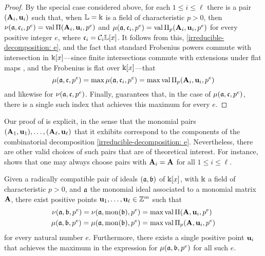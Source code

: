 \documentclass{amsart}
\begin{document}
\begin{proof}
By the special case considered above, for each $1\le i \le \ell$ there is a pair $(\mathbf{A}_i, \mathbf{u}_i)$ such that, when $\mathbb{L}=\Bbbk$ is a field of characteristic $p>0$, then $\nu(\mathfrak{a}, \mathfrak{c}_i, p^e) = \operatorname{val} \Pi(\mathbf{A}_i, \mathbf{u}_i, p^e)$ and $\mu(\mathfrak{a}, \mathfrak{c}_i, p^e) = \operatorname{val} \Pi_p(\mathbf{A}_i, \mathbf{u}_i, p^e)$ for every positive integer $e$, where $\mathfrak{c}_i = \mathcal{C}_i \mathbb{L}[x]$.    It follows from this, \eqref{irreducible-decomposition: e}, and the fact that standard Frobenius powers commute with intersection in $\Bbbk[x]$---since finite intersections commute with extensions under flat maps \cite[Theorem~7.4(ii)]{matsumura}, and the Frobenius is flat over $\Bbbk[x]$---that
%
\[ \mu(\mathfrak{a}, \mathfrak{c}, p^e) = \max  \mu(\mathfrak{a}, \mathfrak{c}_i, p^e)  = \max \operatorname{val} \Pi_p(\mathbf{A}_i, \mathbf{u}_i, p^e) \] and likewise for $\nu(\mathfrak{a}, \mathfrak{c}, p^e)$.  Finally,   guarantees that, in the case of $\mu(\mathfrak{a}, \mathfrak{c}, p^e)$, there is a single such index that achieves this maximum for every $e$.
\end{proof}

\begin{remark}
\label{lifting pairs: R}
{Our proof of}  is explicit, in the sense that the monomial pairs $(\mathbf{A}_1, \mathbf{u}_1), \ldots, (\mathbf{A}_{\ell}, \mathbf{u}_{\ell})$ that it exhibits correspond to the components of the combinatorial decomposition \eqref{irreducible-decomposition: e}.  Nevertheless, there are other valid choices of such pairs that are of theoretical interest.
For instance,   shows that one may always choose pairs with $\mathbf{A}_i=\mathbf{A}$ for all $1 \leq i \leq \ell$.
\end{remark}

\begin{theorem}%
   \label{reduce-to-monomial-case: T}
   Given a radically compatible pair of ideals $(\mathfrak{a}, \mathfrak{b})$ of $\Bbbk[x]$, with $\Bbbk$ a field of characteristic $p>0$, and $\mathfrak{a}$ the monomial ideal associated to a monomial matrix $\mathbf{A}$, there exist positive points $\mathbf{u}_1, \ldots, \mathbf{u}_{\ell} \in \mathbb{Z}^m$ such that
\begin{align*} 
\nu(\mathfrak{a}, \mathfrak{b}, p^e) = \nu(\mathfrak{a}, \operatorname{mon}(\mathfrak{b}), p^e) & = \max \operatorname{val} \Pi(\mathbf{A},\mathbf{u}_i, p^e) \\ 
\mu(\mathfrak{a}, \mathfrak{b}, p^e) = \mu(\mathfrak{a}, \operatorname{mon}(\mathfrak{b}), p^e) & = \max \operatorname{val} \Pi_p(\mathbf{A},\mathbf{u}_i, p^e)
\end{align*}
%
for every natural number $e$.  Furthermore, there exists a single positive point $\mathbf{u}_i$ that achieves the maximum in the expression for $\mu(\mathfrak{a}, \mathfrak{b}, p^e)$ for all such $e$.
\end{theorem}
\end{document}
